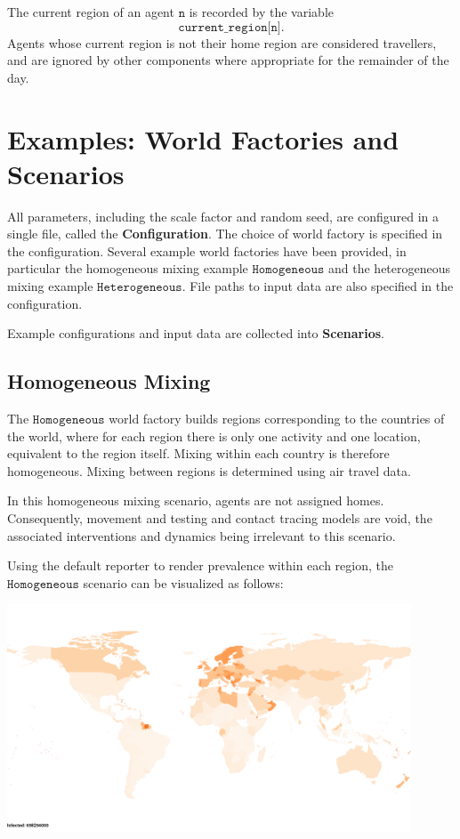 \documentclass[10pt,letterpaper]{article}
\begin{document}
The current region of an agent $\texttt{n}$ is recorded by the variable $$\texttt{current{\_}region[n]}.$$ Agents whose current region is not their home region are considered travellers, and are ignored by other components where appropriate for the remainder of the day.

\section{Examples: World Factories and Scenarios}

All parameters, including the scale factor and random seed, are configured in a single file, called the \textbf{Configuration}. The choice of world factory is specified in the configuration. Several example world factories have been provided, in particular the homogeneous mixing example $\texttt{Homogeneous}$ and the heterogeneous mixing example $\texttt{Heterogeneous}$. File paths to input data are also specified in the configuration.  

Example configurations and input data are collected into \textbf{Scenarios}.

\subsection{Homogeneous Mixing}

The $\texttt{Homogeneous}$ world factory builds regions corresponding to the countries of the world, where for each region there is only one activity and one location, equivalent to the region itself. Mixing within each country is therefore homogeneous. Mixing between regions is determined using air travel data.

In this homogeneous mixing scenario, agents are not assigned homes. Consequently, movement and testing and contact tracing models are void, the associated interventions and dynamics being irrelevant to this scenario.

Using the default reporter to render prevalence within each region, the $\texttt{Homogeneous}$ scenario can be visualized as follows:

\begin{center}
\includegraphics[width=0.9\textwidth]{homogeneous}
\end{center}
\end{document}
